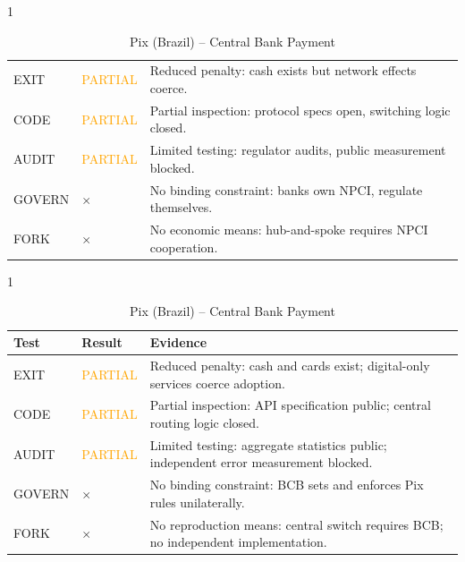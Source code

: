 \documentclass{article}
\begin{document}
\begin{table}[htbp]
    \begin{subtable}{1\textwidth}
        \centering
        \caption{UPI (India) -- Payment Rail}
        \small
        \begin{tabular}{@{}llp{8.5cm}@{}}
            \toprule
            EXIT & \textcolor{orange}{PARTIAL} & Reduced penalty: cash exists but network effects coerce. \\
            CODE & \textcolor{orange}{PARTIAL} & Partial inspection: protocol specs open, switching logic closed. \\
            AUDIT & \textcolor{orange}{PARTIAL} & Limited testing: regulator audits, public measurement blocked. \\
            GOVERN & $\times$ & No binding constraint: banks own NPCI, regulate themselves. \\
            FORK & $\times$ & No economic means: hub-and-spoke requires NPCI cooperation. \\
            \bottomrule
        \end{tabular}
        \vspace{0.3cm}
    \end{subtable}

    \begin{subtable}{1\textwidth}
        \centering
        \caption{Pix (Brazil) -- Central Bank Payment}
        \small
        \begin{tabular}{@{}llp{8.5cm}@{}}
            \toprule
            \textbf{Test} & \textbf{Result} & \textbf{Evidence} \\
            \midrule
            EXIT & \textcolor{orange}{PARTIAL} & Reduced penalty: cash and cards exist; digital-only services coerce adoption. \\
            CODE & \textcolor{orange}{PARTIAL} & Partial inspection: API specification public; central routing logic closed. \\
            AUDIT & \textcolor{orange}{PARTIAL} & Limited testing: aggregate statistics public; independent error measurement blocked. \\
            GOVERN & $\times$ & No binding constraint: BCB sets and enforces Pix rules unilaterally. \\
            FORK & $\times$ & No reproduction means: central switch requires BCB; no independent implementation. \\
            \bottomrule
        \end{tabular}
        \vspace{0.3cm}
    \end{subtable}


\end{table}
\end{document}

